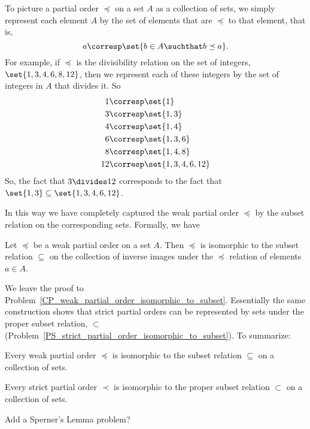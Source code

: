 To picture a partial order $\preceq$ on a set $A$ as a collection of
sets, we simply represent each element $A$ by the set of elements
that are $\preceq$ to that element, that is,
\[
a \corresp \set{b \in A \suchthat b \preceq a}.
\]
For example, if $\preceq$ is the divisibility relation on the set of
integers, $\set{1,3,4,6,8,12}$, then we represent each of these integers
by the set of integers in $A$ that divides it.  So
\begin{align*}
1 & \corresp \set{1}\\
3 & \corresp \set{1,3}\\
4 & \corresp \set{1,4}\\
6 & \corresp \set{1,3,6}\\
8 & \corresp \set{1,4,8}\\
12 & \corresp \set{1,3,4,6, 12}
\end{align*}
So, the fact that $3 \divides 12$ corresponds to the fact that $\set{1,3}
\subseteq \set{1,3,4,6, 12}$.

In this way we have completely captured the weak partial order $\preceq$ by the
subset relation on the corresponding sets.  Formally, we have
\begin{lemma}\label{rgb}
  Let $\preceq$ be a weak partial order on a set $A$.  Then $\preceq$
  is isomorphic to the subset relation $\subseteq$ on the collection
  of inverse images under the $\preceq$ relation of elements $a \in
  A$.
\end{lemma}
We leave the proof to
Problem~\ref{CP_weak_partial_order_isomorphic_to_subset}.  Essentially
the same construction shows that strict partial orders can be
represented by sets under the proper subset%
relation, $\subset$ (Problem~\ref{PS_strict_partial_order_isomorphic_to_subset}).  To
summarize:
\begin{theorem}\label{thm:posetrepsets}
  Every weak partial order $\preceq$ is isomorphic to the subset
  relation $\subseteq$ on a collection of sets.

  Every strict partial order $\prec$ is isomorphic to the proper
  subset relation $\subset$ on a collection of sets.
\end{theorem}


\begin{problems}

\classproblems
{}

\homeworkproblems
{}

\begin{editingnotes}
Add a Sperner's Lemma problem?
\end{editingnotes}

\end{problems}



